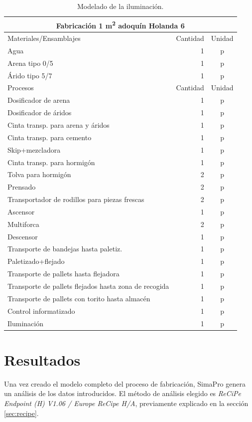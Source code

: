 \begin{table}[!htb]
\centering
\begin{tabular}{p{8cm}rc}
\toprule
\multicolumn{3}{c}{Fabricación 1 \si{m^2} adoquín Holanda 6}\\
\midrule
Materiales/Ensamblajes & Cantidad & Unidad\\
\midrule
Agua & 1 & p\\
Arena tipo 0/5 & 1 & p\\
Árido tipo 5/7 & 1 & p\\
\midrule
Procesos & Cantidad & Unidad\\
\midrule
Dosificador de arena & 1 & p\\
Dosificador de áridos & 1 & p\\
Cinta transp. para arena y áridos & 1 & p\\
Cinta transp. para cemento & 1 & p\\
Skip+mezcladora & 1 & p\\
Cinta transp. para hormigón & 1 & p\\
Tolva para hormigón & 2 & p\\
Prensado & 2 & p\\
Transportador de rodillos para piezas frescas & 2 & p\\
Ascensor & 1 & p\\
Multiforca & 2 & p\\
Descensor & 1 & p\\
Transporte de bandejas hasta paletiz. & 1 & p\\
Paletizado+flejado & 1 & p\\
Transporte de pallets hasta flejadora & 1 & p\\
Transporte de pallets flejados hasta zona de recogida & 1 & p\\
Transporte de pallets con torito hasta almacén & 1 & p\\
Control informatizado & 1 & p\\
Iluminación & 1 & p\\
\bottomrule
\end{tabular}
\caption{Modelado de la iluminación.}
\label{modeladocompleto}
\end{table}

\section{Resultados}

Una vez creado el modelo completo del proceso de fabricación, SimaPro genera un análisis de los datos introducidos. El método de análisis elegido es \textit{ReCiPe Endpoint (H) V1.06 / Europe ReCipe H/A}, previamente explicado en la sección \ref{sec:recipe}.

